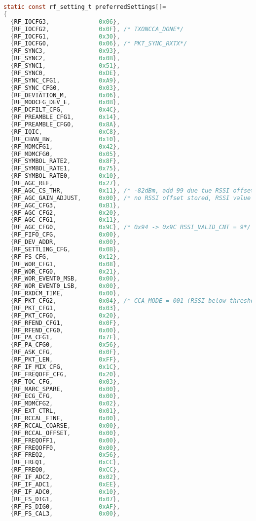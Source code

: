 \begin{lstlisting}[language=C,frame=b,captionpos=b,caption={Struktur mit Adresse-Wert Paaren für die Registerkonfiguration des CC1200 Funkchips},label=lst:cc1200register]
static const rf_setting_t preferredSettings[]=
{
  {RF_IOCFG3,              0x06},
  {RF_IOCFG2,              0x0F}, /* TXONCCA_DONE*/
  {RF_IOCFG1,              0x30},
  {RF_IOCFG0,              0x06}, /* PKT_SYNC_RXTX*/
  {RF_SYNC3,               0x93},
  {RF_SYNC2,               0x0B},
  {RF_SYNC1,               0x51},
  {RF_SYNC0,               0xDE},
  {RF_SYNC_CFG1,           0xA9},
  {RF_SYNC_CFG0,           0x03},
  {RF_DEVIATION_M,         0x06},
  {RF_MODCFG_DEV_E,        0x0B},
  {RF_DCFILT_CFG,          0x4C},
  {RF_PREAMBLE_CFG1,       0x14},
  {RF_PREAMBLE_CFG0,       0x8A},
  {RF_IQIC,                0xC8},
  {RF_CHAN_BW,             0x10},
  {RF_MDMCFG1,             0x42},
  {RF_MDMCFG0,             0x05},
  {RF_SYMBOL_RATE2,        0x8F},
  {RF_SYMBOL_RATE1,        0x75},
  {RF_SYMBOL_RATE0,        0x10},
  {RF_AGC_REF,             0x27},
  {RF_AGC_CS_THR,          0x11}, /* -82dBm, add 99 due tue RSSI offset -> 17 -> 0x11*/
  {RF_AGC_GAIN_ADJUST,     0x00}, /* no RSSI offset stored, RSSI value will be 99dBm over reality, add -99 manually*/
  {RF_AGC_CFG3,            0xB1},
  {RF_AGC_CFG2,            0x20},
  {RF_AGC_CFG1,            0x11},
  {RF_AGC_CFG0,            0x9C}, /* 0x94 -> 0x9C RSSI_VALID_CNT = 9*/
  {RF_FIFO_CFG,            0x00},
  {RF_DEV_ADDR,            0x00},
  {RF_SETTLING_CFG,        0x0B},
  {RF_FS_CFG,              0x12},
  {RF_WOR_CFG1,            0x08},
  {RF_WOR_CFG0,            0x21},
  {RF_WOR_EVENT0_MSB,      0x00},
  {RF_WOR_EVENT0_LSB,      0x00},
  {RF_RXDCM_TIME,          0x00},
  {RF_PKT_CFG2,            0x04}, /* CCA_MODE = 001 (RSSI below threshold)*/
  {RF_PKT_CFG1,            0x03},
  {RF_PKT_CFG0,            0x20},
  {RF_RFEND_CFG1,          0x0F},
  {RF_RFEND_CFG0,          0x00},
  {RF_PA_CFG1,             0x7F},
  {RF_PA_CFG0,             0x56},
  {RF_ASK_CFG,             0x0F},
  {RF_PKT_LEN,             0xFF},
  {RF_IF_MIX_CFG,          0x1C},
  {RF_FREQOFF_CFG,         0x20},
  {RF_TOC_CFG,             0x03},
  {RF_MARC_SPARE,          0x00},
  {RF_ECG_CFG,             0x00},
  {RF_MDMCFG2,             0x02},
  {RF_EXT_CTRL,            0x01},
  {RF_RCCAL_FINE,          0x00},
  {RF_RCCAL_COARSE,        0x00},
  {RF_RCCAL_OFFSET,        0x00},
  {RF_FREQOFF1,            0x00},
  {RF_FREQOFF0,            0x00},
  {RF_FREQ2,               0x56},
  {RF_FREQ1,               0xCC},
  {RF_FREQ0,               0xCC},
  {RF_IF_ADC2,             0x02},
  {RF_IF_ADC1,             0xEE},
  {RF_IF_ADC0,             0x10},
  {RF_FS_DIG1,             0x07},
  {RF_FS_DIG0,             0xAF},
  {RF_FS_CAL3,             0x00},

\end{lstlisting}
